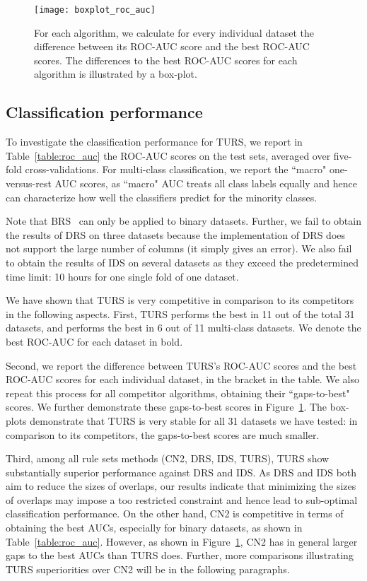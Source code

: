 \begin{figure}[ht]
\texttt{[image: boxplot\_roc\_auc]}	
\caption{For each algorithm, we calculate for every individual dataset the difference between its ROC-AUC score and the best ROC-AUC scores. The differences to the best ROC-AUC scores for each algorithm is illustrated by a box-plot.} \label{fig:diff_to_best_auc}
\end{figure}

\subsection{Classification performance} \label{subsec:classifier_perf}
To investigate the classification performance for TURS, we report  in Table~\ref{table:roc_auc} the ROC-AUC scores on the test sets, averaged over five-fold cross-validations. For multi-class classification, we report the ``macro" one-versus-rest AUC scores, as ``macro" AUC treats all class labels equally and hence can characterize how well the classifiers predict for the minority classes. 

Note that BRS~\citep{wang2017bayesian} can only be applied to binary datasets. Further, we fail to obtain the results of DRS on three datasets because the implementation of DRS does not support the large number of columns (it simply gives an error). We also fail to obtain the results of IDS on several datasets as they exceed the predetermined time limit: 10 hours for one single fold of one dataset. 

We have shown that TURS is very competitive in comparison to its competitors in the following aspects. First, TURS performs the best in 11 out of the total 31 datasets, and performs the best in 6 out of 11 multi-class datasets. We denote the best ROC-AUC for each dataset in bold. 

Second, we report the difference between TURS's ROC-AUC scores and the best ROC-AUC scores for each individual dataset, in the bracket in the table. We also repeat this process for all competitor algorithms, obtaining their ``gaps-to-best" scores. We further demonstrate these gaps-to-best scores in Figure~\ref{fig:diff_to_best_auc}. The box-plots demonstrate that TURS is very stable for all 31 datasets we have tested: in comparison to its competitors, the gaps-to-best scores are much smaller. 

Third, among all rule sets methods (CN2, DRS, IDS, TURS), TURS show substantially superior performance against DRS and IDS. As DRS and IDS both aim to reduce the sizes of overlaps, our results indicate that minimizing the sizes of overlaps may impose a too restricted constraint and hence lead to sub-optimal classification performance. On the other hand, CN2 is competitive in terms of obtaining the best AUCs, especially for binary datasets, as shown in Table~\ref{table:roc_auc}. However,  as shown in Figure~\ref{fig:diff_to_best_auc}, CN2 has in general larger gaps to the best AUCs than TURS does. Further, more comparisons illustrating TURS superiorities over CN2 will be in the following paragraphs. 

